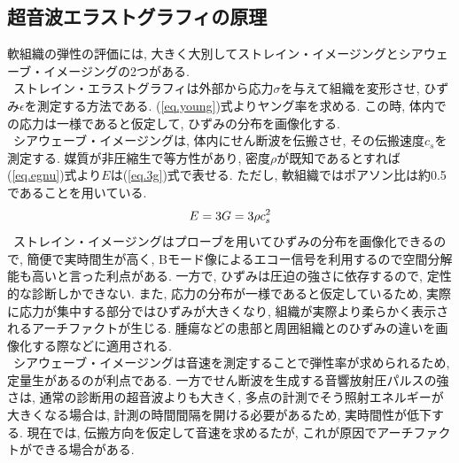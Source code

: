 \subsection{超音波エラストグラフィの原理\cite{siina_2}}
軟組織の弾性の評価には, 大きく大別してストレイン・イメージングとシアウェーブ・イメージングの2つがある. 
\\\ ストレイン・エラストグラフィは外部から応力$\sigma$を与えて組織を変形させ, ひずみ$\epsilon$を測定する方法である. (\ref{eq.young})式よりヤング率を求める. この時, 体内での応力は一様であると仮定して, ひずみの分布を画像化する. 
\\\ シアウェーブ・イメージングは, 体内にせん断波を伝搬させ, その伝搬速度$c_s$を測定する. 媒質が非圧縮生で等方性があり, 密度$\rho$が既知であるとすれば(\ref{eq.egnu})式より$E$は(\ref{eq.3g})式で表せる. ただし, 軟組織ではポアソン比は約0.5であることを用いている. 
\begin{equation}
\label{eq.3g}
\\E=  3G = 3\rho c_s^2
\end{equation}
\ ストレイン・イメージングはプローブを用いてひずみの分布を画像化できるので, 簡便で実時間生が高く, Bモード像によるエコー信号を利用するので空間分解能も高いと言った利点がある. 一方で, ひずみは圧迫の強さに依存するので, 定性的な診断しかできない. また, 応力の分布が一様であると仮定しているため, 実際に応力が集中する部分ではひずみが大きくなり, 組織が実際より柔らかく表示されるアーチファクトが生じる. 腫瘍などの患部と周囲組織とのひずみの違いを画像化する際などに適用される. 
\\\ シアウェーブ・イメージングは音速を測定することで弾性率が求められるため, 定量生があるのが利点である. 一方でせん断波を生成する音響放射圧パルスの強さは, 通常の診断用の超音波よりも大きく, 多点の計測でそう照射エネルギーが大きくなる場合は, 計測の時間間隔を開ける必要があるため, 実時間性が低下する\cite{onkyouhousya}. 現在では, 伝搬方向を仮定して音速を求めるたが, これが原因でアーチファクトができる場合がある.
